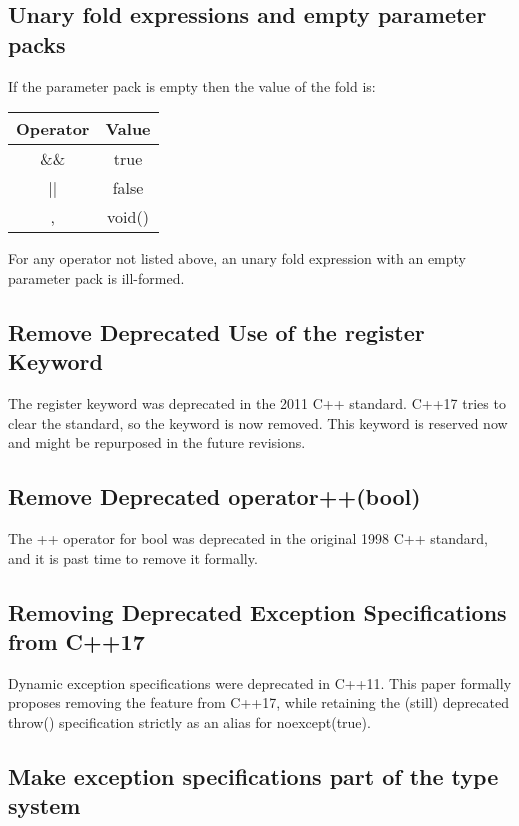 \subsection{Unary fold expressions and empty parameter packs}

If the parameter pack is empty then the value of the fold is:

\begin{tabular}{|c|c|}
\hline 
Operator & Value \\ 
\hline 
\&\& & true \\ 
\hline 
|| & false \\ 
\hline 
, & void() \\ 
\hline 
\end{tabular} 

For any operator not listed above, an unary fold expression with an empty parameter pack is ill-formed.

\subsection{Remove Deprecated Use of the register Keyword}

The register keyword was deprecated in the 2011 C++ standard. C++17 tries to clear the standard, so the keyword is now removed. This keyword is reserved now and might be repurposed in the future revisions. 

\subsection{Remove Deprecated operator++(bool)}

The ++ operator for bool was deprecated in the original 1998 C++ standard, and it is past time to remove it formally. 

\subsection{Removing Deprecated Exception Specifications from C++17}

Dynamic exception specifications were deprecated in C++11. This paper formally proposes removing the feature from C++17, while retaining the (still) deprecated throw() specification strictly as an alias for noexcept(true).

\subsection{Make exception specifications part of the type system}


